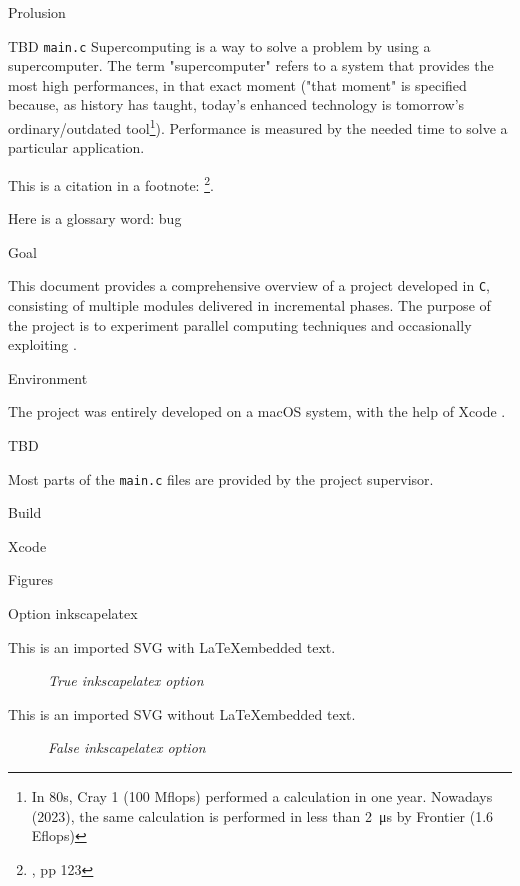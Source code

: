 \begin{chapter}{Prolusion}
    \begin{section}{TBD}
		\texttt{main.c} Supercomputing is a way to solve a problem by using a supercomputer. The term "supercomputer" refers to a system that provides the most high performances, in that exact moment ("that moment" is specified because, as history has taught, today's enhanced technology is tomorrow's ordinary/outdated tool\footnote{In 80s, Cray 1 (100 Mflops) performed a calculation in one year. Nowadays (2023), the same calculation is performed in less than \SI{2}{\micro\second} by Frontier (1.6 Eflops)}). Performance is measured by the needed time to solve a particular application.
        \par This is a citation in a footnote: \footnote{\cite{martin2009clean}, pp 123}.
        \par Here is a glossary word: \gls{bug}
    \end{section}
	\begin{section}{Goal}
		\par This document provides a comprehensive overview of a project developed in \texttt{C}, consisting of multiple modules delivered in incremental phases. The purpose of the project is to experiment parallel computing techniques and occasionally exploiting .
	\end{section}
	\begin{section}{Environment}
		\par The project was entirely developed on a macOS system, with the help of Xcode .
	\end{section}
	\begin{section}{TBD}
		\par Most parts of the \texttt{main.c} files are provided by the project supervisor.
	\end{section}
	\begin{section}{Build}
		\par
		\begin{subsection}{Xcode}
			\par
		\end{subsection}
	\end{section}
    \begin{section}{Figures}
    	\begin{subsection}{Option inkscapelatex}
		\par This is an imported SVG with \LaTeX embedded text.
		\begin{figure}[ht]
			\centering
			
			\caption{\emph{True inkscapelatex option}}
			\label{fig:latexembedded}
		\end{figure}
		\par This is an imported SVG without \LaTeX embedded text.
		\begin{figure}[ht]
			\centering
			
			\caption{\emph{False inkscapelatex option}}
			\label{fig:latexnotembedded}
		\end{figure}
	\end{subsection}
    \end{section}
\end{chapter}